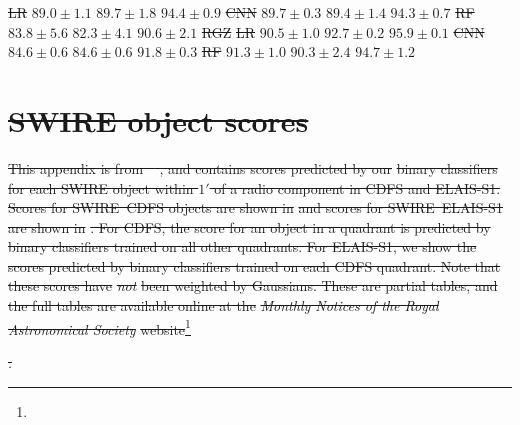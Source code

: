 \documentclass[11pt, a4paper]{book}
\providecommand{\DIFdeltex}[1]{{\protect\color{red}\sout{#1}}}                      %
\providecommand{\DIFdelFL}[1]{\DIFdel{#1}} %
\providecommand{\DIFdel}[1]{\texorpdfstring{\DIFdeltex{#1}}{}} %
\begin{document}
\DIFdelFL{LR }%
\DIFdelFL{$89.0 \pm 1.1$ }%
\DIFdelFL{$89.7 \pm 1.8$ }%
\DIFdelFL{$94.4 \pm 0.9$}%
\DIFdelFL{CNN }%
\DIFdelFL{$89.7 \pm 0.3$ }%
\DIFdelFL{$89.4 \pm 1.4$ }%
\DIFdelFL{$94.3 \pm 0.7$}%
\DIFdelFL{RF }%
\DIFdelFL{$83.8 \pm 5.6$ }%
\DIFdelFL{$82.3 \pm 4.1$ }%
\DIFdelFL{$90.6 \pm 2.1$}%
\DIFdelFL{RGZ }%
\DIFdelFL{LR }%
\DIFdelFL{$90.5 \pm 1.0$ }%
\DIFdelFL{$92.7 \pm 0.2$ }%
\DIFdelFL{$95.9 \pm 0.1$}%
\DIFdelFL{CNN }%
\DIFdelFL{$84.6 \pm 0.6$ }%
\DIFdelFL{$84.6 \pm 0.6$ }%
\DIFdelFL{$91.8 \pm 0.3$}%
\DIFdelFL{RF }%
\DIFdelFL{$91.3 \pm 1.0$ }%
\DIFdelFL{$90.3 \pm 2.4$ }%
\DIFdelFL{$94.7 \pm 1.2$}%

\section{\DIFdel{SWIRE object scores}}%
\addtocounter{section}{-1}%

\DIFdel{This appendix is from \mbox{%
\citet{alger18radio}}\hspace{0pt}%
, and contains scores predicted by our }%
\DIFdel{binary classifiers for each
  SWIRE object within $1'$ of a radio component in CDFS and ELAIS-S1. Scores
  for SWIRE~CDFS objects are shown in }%
\DIFdel{and scores for
  SWIRE~ELAIS-S1 are shown in }%
\DIFdel{. For CDFS, the score
  for an object in a quadrant is predicted by binary classifiers trained on
  all other quadrants. For ELAIS-S1, we show the scores predicted by binary
  classifiers trained on each CDFS quadrant. Note that these scores have
  }\emph{\DIFdel{not}} %
\DIFdel{been weighted by Gaussians. These are partial tables, and the full tables are available online at the }\emph{\DIFdel{Monthly Notices of the Royal Astronomical Society}} %
\DIFdel{website}\footnote{%
}%
\addtocounter{footnote}{-1}%
\DIFdel{.
}%
\end{document}
